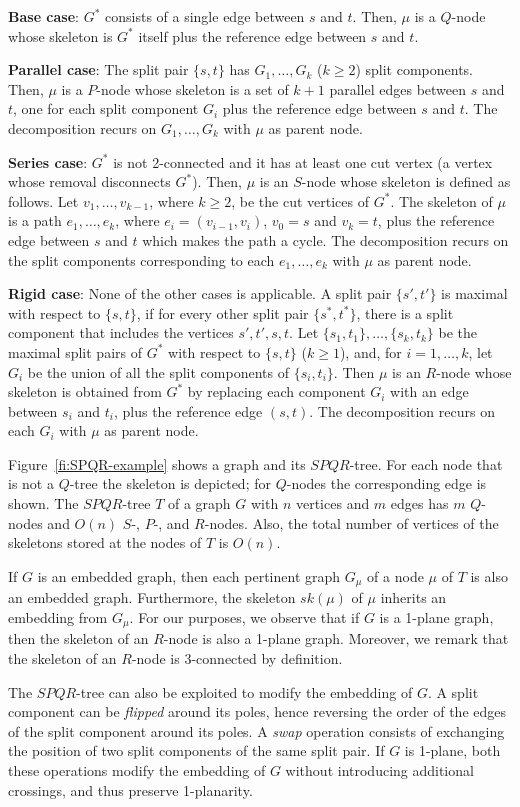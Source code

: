 \documentclass{article}
\begin{document}
\textbf{Base case}: $G^*$ consists of a single edge between $s$ and $t$. Then, $\mu$ is a $Q$-node whose skeleton is $G^*$ itself plus the reference edge between $s$ and $t$.

\textbf{Parallel case}: The split pair $\{s,t\}$ has $G_1,\dots,G_k$ ($k \geq 2$) split components.
Then, $\mu$ is a $P$-node whose skeleton is a set of $k+1$ parallel edges between $s$ and $t$, one for each split component $G_i$ plus the reference edge between $s$ and $t$.
The decomposition recurs on $G_1,\dots,G_k$ with $\mu$ as parent node.

\textbf{Series case}: $G^*$ is not 2-connected and it has at least one cut vertex (a vertex whose removal disconnects $G^*$).
Then, $\mu$ is an $S$-node whose skeleton is defined as follows.
Let $v_1,\dots,v_{k-1}$, where $k \geq 2$, be the cut vertices of $G^*$.
The skeleton of $\mu$ is a path $e_1,\dots,e_k$, where $e_i= (v_{i-1},v_i)$, $v_0=s$ and $v_k=t$, plus the reference edge between $s$ and $t$ which makes the path a cycle.
The decomposition recurs on the split components corresponding to each $e_1,\dots,e_k$ with $\mu$ as parent node.

\textbf{Rigid case}: None of the other cases is applicable.
A split pair $\{s',t'\}$ is maximal with respect to $\{s,t\}$, if for every other split pair $\{s^*,t^*\}$, there is a split component that includes the vertices $s',t',s,t$.
Let $\{s_1,t_1\},\dots,\{s_k,t_k\}$ be the maximal split pairs of $G^*$ with respect to $\{s,t\}$ ($k \geq 1$), and, for $i=1,\dots,k$, let $G_i$ be the union of all the split components of $\{s_i,t_i\}$.
Then $\mu$ is an $R$-node whose skeleton is obtained from $G^*$ by replacing each component $G_i$ with an edge between $s_i$ and $t_i$, plus the reference edge $(s,t)$.
The decomposition recurs on each $G_i$ with $\mu$ as parent node.


\medskip

Figure~\ref{fi:SPQR-example} shows a graph and its $SPQR$-tree. For each node that is not a $Q$-tree the skeleton is depicted; for $Q$-nodes the corresponding edge is shown. The $SPQR$-tree $T$ of a graph $G$ with $n$ vertices and $m$ edges has $m$ $Q$-nodes and $O(n)$ $S$-, $P$-, and $R$-nodes. Also, the total number of vertices of the skeletons stored at the nodes of $T$ is $O(n)$.


\medskip

If $G$ is an embedded graph, then each pertinent graph $G_\mu$ of a node $\mu$ of $T$ is also an embedded graph.  Furthermore, the skeleton $sk(\mu)$ of $\mu$ inherits an embedding from $G_\mu$. For our purposes, we observe that if $G$ is a 1-plane graph, then the skeleton of an $R$-node is also a 1-plane graph. Moreover, we remark that the skeleton of an $R$-node is $3$-connected by definition.

The $SPQR$-tree can also be exploited to modify the embedding of $G$. A  split component can be \emph{flipped} around its poles, hence reversing the order of the edges of the split component around its poles.  A \emph{swap} operation consists of exchanging the position of two split components of the same split pair. If $G$ is 1-plane, both these operations modify the embedding of $G$ without introducing additional crossings, and thus preserve 1-planarity.

\clearpage{}
\end{document}
